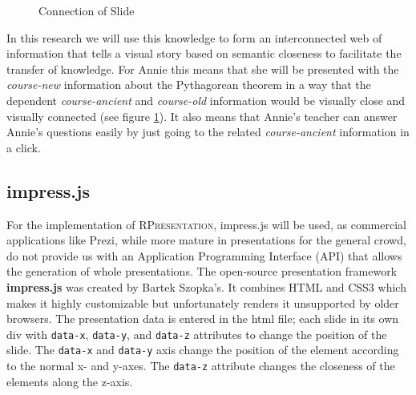 \documentclass[twoside, 12pt]{article}
\newcommand{\sys}{\textsc{RPresentation}\xspace}
\begin{document}
\begin{figure}
\vspace{-28pt}
  \begin{center}
  \end{center}
\vspace{-20pt}
  \caption{Connection of Slide}
  \label{fig:arrowspyg}
\vspace{-10pt}
\end{figure}


In this research we will use this knowledge to form an interconnected web of information that tells a visual story based on semantic closeness to facilitate the transfer of knowledge. For Annie this means that she will be presented with the \textit{course-new} information about the Pythagorean theorem in a way that the dependent \textit{course-ancient} and \textit{course-old} information would be visually close and visually connected (see figure \ref{fig:arrowspyg}). It also means that Annie's teacher can answer Annie's questions easily by just going to the related \textit{course-ancient} information in a click.

\subsection{impress.js}
\label{sec:Impressjs}

For the implementation of \sys, impress.js will be used, as commercial applications like Prezi, while more mature in presentations for the general crowd, do not provide us with an Application Programming Interface (API) that allows the generation of whole presentations. The open-source presentation framework \textbf{impress.js} \cite{JSImpress:npentrel14} was created by Bartek Szopka's. It combines HTML and CSS3 which makes it highly customizable but unfortunately renders it unsupported by older browsers. The presentation data is entered in the html file; each slide in its own div with \texttt{data-x}, \texttt{data-y}, and \texttt{data-z} attributes to change the position of the slide. The \texttt{data-x} and \texttt{data-y} axis change the position of the element according to the normal x- and y-axes. The \texttt{data-z} attribute changes the closeness of the elements along the z-axis.\\
\end{document}
